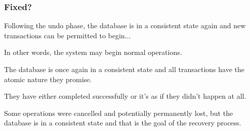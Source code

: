 \begin{frame}
\frametitle{Fixed?}


Following the undo phase, the database is in a consistent state again and new transactions can be permitted to begin... 

In other words, the system may begin normal operations.

The database is once again in a consistent state and all transactions have the atomic nature they promise. 

They have either completed successfully or it's as if they didn't happen at all.

Some operations were cancelled and potentially permanently lost, but the database is in a consistent state and that is the goal of the recovery process.

\end{frame}








